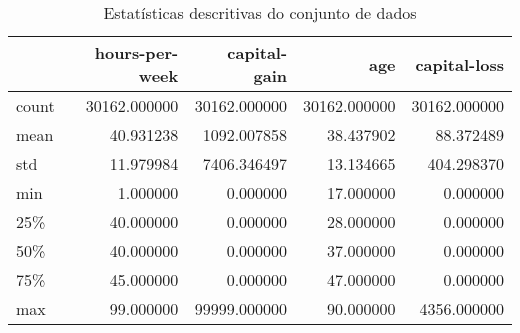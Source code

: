 \begin{table}
\centering
\caption{Estatísticas descritivas do conjunto de dados}
\label{tbl:descriptive_statistics}
\begin{tabular}{lrrrr}
\toprule
{} &  hours-per-week &  capital-gain &           age &  capital-loss \\
\midrule
count &    30162.000000 &  30162.000000 &  30162.000000 &  30162.000000 \\
mean  &       40.931238 &   1092.007858 &     38.437902 &     88.372489 \\
std   &       11.979984 &   7406.346497 &     13.134665 &    404.298370 \\
min   &        1.000000 &      0.000000 &     17.000000 &      0.000000 \\
25\%   &       40.000000 &      0.000000 &     28.000000 &      0.000000 \\
50\%   &       40.000000 &      0.000000 &     37.000000 &      0.000000 \\
75\%   &       45.000000 &      0.000000 &     47.000000 &      0.000000 \\
max   &       99.000000 &  99999.000000 &     90.000000 &   4356.000000 \\
\bottomrule
\end{tabular}
\end{table}
